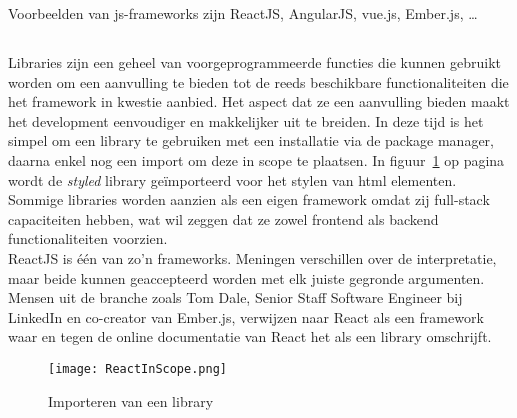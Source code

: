 Voorbeelden van \gls{js}-frameworks zijn ReactJS, AngularJS, vue.js, Ember.js, \dots

\subsection{}
\label{sec:jsLibrary}

Libraries zijn een geheel van voorgeprogrammeerde functies die kunnen gebruikt worden om een aanvulling te bieden tot de reeds beschikbare functionaliteiten die het framework in kwestie aanbied. Het aspect dat ze een aanvulling bieden maakt het development eenvoudiger en makkelijker uit te breiden. In deze tijd is het simpel om een library te gebruiken met een installatie via de package manager, daarna enkel nog een import om deze in scope te plaatsen. In figuur~\ref{fig:libraryImport} op pagina~\pageref{fig:libraryImport} wordt de \textit{styled} library geïmporteerd voor het stylen van \gls{html} elementen.\\
Sommige libraries worden aanzien als een eigen framework omdat zij full-stack capaciteiten hebben, wat wil zeggen dat ze zowel frontend als backend functionaliteiten voorzien.\\
ReactJS is één van zo'n frameworks. Meningen verschillen over de interpretatie, maar beide kunnen geaccepteerd worden met elk juiste gegronde argumenten. Mensen uit de branche zoals Tom Dale, Senior Staff Software Engineer bij LinkedIn en co-creator van Ember.js, verwijzen naar React als een framework waar en tegen de online documentatie van React het als een library omschrijft.

\begin{figure}[h!]
    \texttt{[image: ReactInScope.png]}
    \caption{Importeren van een library}
    \label{fig:libraryImport}
\end{figure}

\section{}
\label{sec:onderzoeksvraag}

